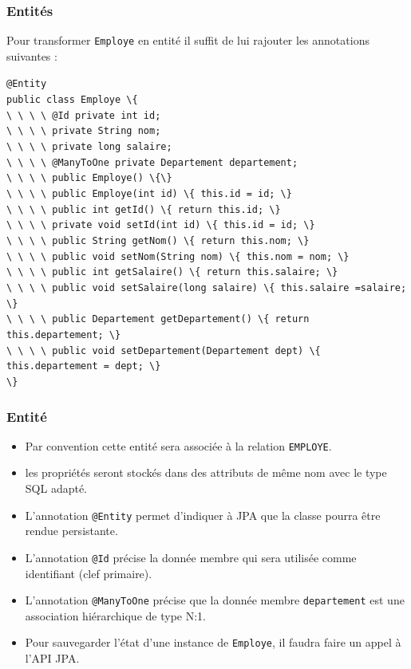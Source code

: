 \documentclass[xcolor=pdftex,x11names,table]{beamer}
\begin{document}
  \begin{frame}
     \frametitle{Entités}
     Pour transformer \texttt{Employe} en entité il suffit de lui rajouter les annotations suivantes :  \pause
     \begin{block}{}\footnotesize
      \lstinline$@Entity$\\
    	\lstinline$public class Employe \{$\\
    	\lstinline$\ \ \ \ @Id private int id;$\\
    	\lstinline$\ \ \ \ private String nom;$\\
    	\lstinline$\ \ \ \ private long salaire;$\\
    	\lstinline$\ \ \ \ @ManyToOne private Departement departement;$\\
    	\lstinline$\ \ \ \ public Employe() \{\}$\\
    	\lstinline$\ \ \ \ public Employe(int id) \{ this.id = id; \}$\\
    	\lstinline$\ \ \ \ public int getId() \{ return this.id; \}$\\
    	\lstinline$\ \ \ \ private void setId(int id) \{ this.id = id; \}$\\
    	\lstinline$\ \ \ \ public String getNom() \{ return this.nom; \}$\\
    	\lstinline$\ \ \ \ public void setNom(String nom) \{ this.nom = nom; \}$\\
    	\lstinline$\ \ \ \ public int getSalaire() \{ return this.salaire; \}$\\
    	\lstinline$\ \ \ \ public void setSalaire(long salaire) \{ this.salaire =salaire; \}$\\
    	\lstinline$\ \ \ \ public Departement getDepartement() \{ return this.departement; \}$\\
    	\lstinline$\ \ \ \ public void setDepartement(Departement dept) \{ this.departement = dept; \}$\\
    	\lstinline$\}$
		 \end{block}
  \end{frame}
  \lstset{basicstyle=\normalsize}
  \begin{frame}
    \frametitle{Entité}
    \begin{itemize}
		  \item Par convention cette entité sera associée à la relation \texttt{EMPLOYE}.
		  \item les propriétés seront stockés dans des attributs de même nom avec le type SQL adapté.
		  \item L'annotation \lstinline$@Entity$ permet d'indiquer à JPA que la classe pourra être rendue persistante.
		  \item L'annotation \lstinline$@Id$ précise la donnée membre qui sera utilisée comme identifiant (clef primaire).
		  \item L'annotation \lstinline$@ManyToOne$ précise que la donnée membre \texttt{departement} est une association hiérarchique de type N:1.
		  \item Pour sauvegarder l'état d'une instance de \texttt{Employe}, il faudra faire un appel à l'API JPA. 
		\end{itemize}
  \end{frame}
\end{document}

